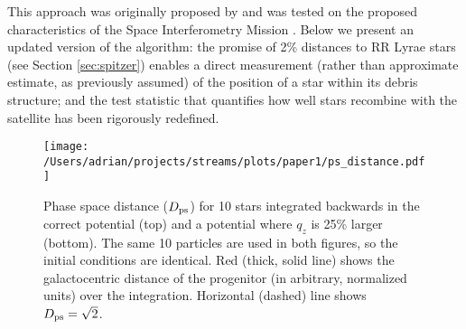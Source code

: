 \documentclass{emulateapj}
\begin{document}
This approach was originally proposed by \citet{johnston99a} and was tested on the proposed characteristics of the Space
Interferometry Mission \citep{unwin08}. Below we present an updated version of the algorithm:
the promise of 2\% distances to RR Lyrae stars (see Section
\ref{sec:spitzer}) enables a direct measurement (rather than
approximate estimate, as previously assumed) of the position of a star within its debris
structure; and the test statistic that quantifies how well stars recombine
with the satellite has been rigorously redefined.

\begin{figure}[h]
\begin{center}
\texttt{[image: /Users/adrian/projects/streams/plots/paper1/ps\_distance.pdf]}
\caption{Phase space distance ($D_{\rm ps}$) for 10 stars integrated backwards in the correct potential (top) and a potential where $q_z$ is 25\% larger (bottom). The same 10 particles are used in both figures, so the initial conditions are identical. Red (thick, solid line) shows the galactocentric distance of the progenitor (in arbitrary, normalized units) over the integration. Horizontal (dashed) line shows $D_{\rm ps}=\sqrt{2}$.}\label{fig:ps_distance}
\end{center}
\end{figure}
\end{document}
